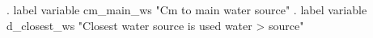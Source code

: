 . label variable cm_main_ws "Cm to main water source"
{\smallskip}
. label variable d_closest_ws "Closest water source is used water
>  source" 
{\smallskip}
